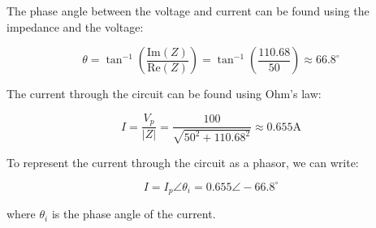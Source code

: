 \begin{enumerate}
{The phase angle between the voltage and current can be found using the impedance and the voltage:

$$ \theta = \tan^{-1}\left(\frac{\text{Im}(Z)}{\text{Re}(Z)}\right) = \tan^{-1}\left(\frac{110.68}{50}\right) \approx 66.8^\circ $$


The current through the circuit can be found using Ohm's law:

$$ I = \frac{V_p}{|Z|} = \frac{100}{\sqrt{50^2 + 110.68^2}} \approx 0.655 \text{A}$$

To represent the current through the circuit as a phasor, we can write:

$$ I = I_p \angle \theta_i = 0.655 \angle -66.8^\circ$$

where $\theta_i$ is the phase angle of the current.
}
\end{enumerate}
